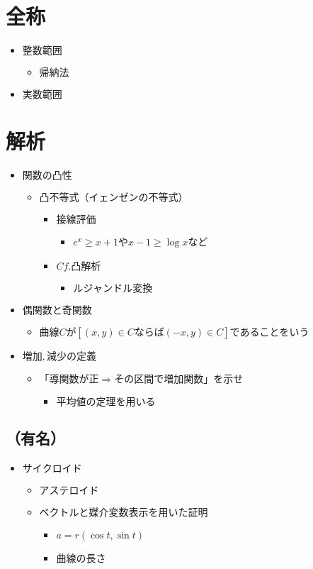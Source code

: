 \documentclass[dvipdfmx,uplatex]{jsarticle}
\begin{document}
\section{全称}
\begin{itemize}
	\item $ 整数範囲$
	\begin{itemize}
		\item $ 帰納法$
	\end{itemize}
	\item $ 実数範囲$
\end{itemize}

\section{解析}
\begin{itemize}
	\item $ 関数の凸性$
	\begin{itemize}
		\item $ 凸不等式（イェンゼンの不等式）$
		\begin{itemize}
			\item $ 接線評価$
			\begin{itemize}
				\item $e^x \geq x+1$や$x-1 \geq \log x$など
			\end{itemize}
			\item $ Cf. 凸解析$
			\begin{itemize}
				\item $ ルジャンドル変換$
			\end{itemize}
		\end{itemize}
	\end{itemize}
	\item $ 偶関数と奇関数$
	\begin{itemize}
		\item $ 曲線Cが [(x,y) \in C ならば (-x,y) \in C] であることをいう$
	\end{itemize}
	\item $ 増加,減少の定義$
	\begin{itemize}
		\item $ 「導関数が正⇒その区間で増加関数」を示せ$
		\begin{itemize}
			\item $ 平均値の定理を用いる$
		\end{itemize}
	\end{itemize}
\end{itemize}
\subsection{（有名）}
\begin{itemize}
	\item $ サイクロイド$
	\begin{itemize}
		\item $ アステロイド$
		\item $ ベクトルと媒介変数表示を用いた証明$
		\begin{itemize}
			\item $ a = r(\cos t, \sin t)$
			\item $ 曲線の長さ$
		\end{itemize}
	\end{itemize}
\end{itemize}
\end{document}

